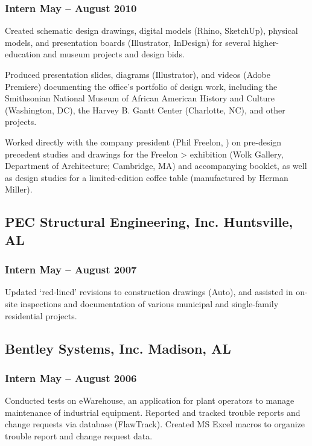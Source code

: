 \documentclass[letterpaper, oneside, 10pt]{article}
\begin{document}
\subsubsection*{Intern\DotSep{0.25em} May -- August 2010}

Created schematic design drawings, digital models (Rhino, SketchUp), physical
models, and presentation boards (Illustrator, InDesign) for several
higher-education and museum projects and design bids.

Produced presentation slides, diagrams (Illustrator), and videos (Adobe
Premiere) documenting the office’s portfolio of design work, including the
Smithsonian National Museum of African American History and Culture
(Washington, DC), the Harvey B. Gantt Center (Charlotte, NC), and
other projects.

Worked directly with the company president (Phil Freelon, ) on
pre-design precedent studies and drawings for the Freelon > 
exhibition (Wolk Gallery,  Department of Architecture; Cambridge, MA)
and accompanying booklet, as well as design studies for a limited-edition
coffee table (manufactured by Herman Miller).


\subsection*{PEC Structural Engineering, Inc.\DotSep{0.25em} Huntsville, AL}

\subsubsection*{Intern\DotSep{0.25em} May -- August 2007}

Updated `red-lined' revisions to construction drawings (Auto), and
assisted in on-site inspections and documentation of various municipal and
single-family residential projects.

\subsection*{Bentley Systems, Inc.\DotSep{0.25em} Madison, AL}

\subsubsection*{Intern\DotSep{0.25em} May -- August 2006}

Conducted tests on eWarehouse, an application for plant operators to manage
maintenance of industrial equipment. Reported and tracked trouble reports and
change requests via database (FlawTrack). Created MS Excel macros to organize
trouble report and change request data.
\end{document}
